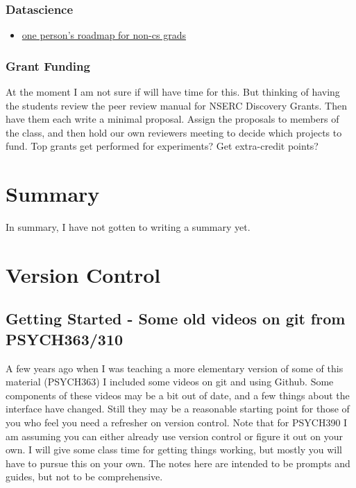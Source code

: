 \documentclass[
  letterpaper,
  DIV=11,
  numbers=noendperiod]{scrreprt}
\providecommand{\tightlist}{%
  \setlength{\itemsep}{0pt}\setlength{\parskip}{0pt}}\usepackage{longtable,booktabs,array}
\begin{document}
\subsection{Datascience}\label{datascience}

\begin{itemize}
\tightlist
\item
  \href{https://medium.com/@fareedkhandev/complete-roadmap-of-data-science-for-non-cs-cs-students-equivalent-to-a-degree-1a0a810360c0}{one
  person's roadmap for non-cs grads}
\end{itemize}

\subsection{Grant Funding}\label{grant-funding}

At the moment I am not sure if will have time for this. But thinking of
having the students review the peer review manual for NSERC Discovery
Grants. Then have them each write a minimal proposal. Assign the
proposals to members of the class, and then hold our own reviewers
meeting to decide which projects to fund. Top grants get performed for
experiments? Get extra-credit points?


\chapter{Summary}\label{summary}

In summary, I have not gotten to writing a summary yet.

\cleardoublepage
{}
{}
\appendix

\chapter{Version Control}\label{sec-versionControl}

\section{Getting Started - Some old videos on git from
PSYCH363/310}\label{getting-started---some-old-videos-on-git-from-psych363310}

A few years ago when I was teaching a more elementary version of some of
this material (PSYCH363) I included some videos on git and using Github.
Some components of these videos may be a bit out of date, and a few
things about the interface have changed. Still they may be a reasonable
starting point for those of you who feel you need a refresher on version
control. Note that for PSYCH390 I am assuming you can either already use
version control or figure it out on your own. I will give some class
time for getting things working, but mostly you will have to pursue this
on your own. The notes here are intended to be prompts and guides, but
not to be comprehensive.
\end{document}
